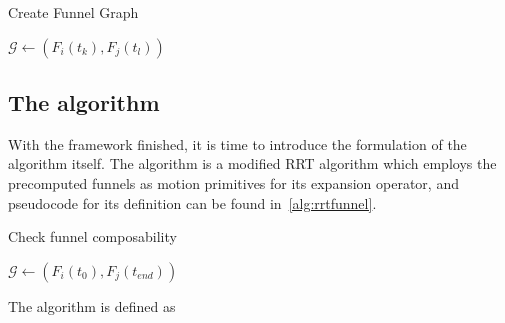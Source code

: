 \begin{algorithm}
  \caption{Create Funnel Graph}
  \label{alg:create-funnel-graph}
  \DontPrintSemicolon \SetAlgoNoLine

   

   {  {
       {  {
           { \(\mathcal{G}
            \leftarrow{} \left( F_{i}(t_{k}), F_{j}(t_{l}) \right)\) } } } } }

\end{algorithm}

\subsection{The \rrtfunnel{} algorithm}

With the framework finished, it is time to introduce the formulation of the
\rrtfunnel{} algorithm itself. The \rrtfunnel{} algorithm is a modified \ac{RRT}
algorithm which employs the precomputed funnels as motion primitives for its
expansion operator, and pseudocode for its definition can be found
in~\cref{alg:rrtfunnel}.

\begin{algorithm}
  \caption{Check funnel composability}
  \label{alg:create-funnel-graph}
  \DontPrintSemicolon \SetAlgoNoLine

   

   {  {
       { \(\mathcal{G} \leftarrow{}
        \left( F_{i}(t_{0}), F_{j}(t_{end}) \right)\) } \; }\; }\;

\end{algorithm}

The \rrtfunnel{} algorithm is defined as

